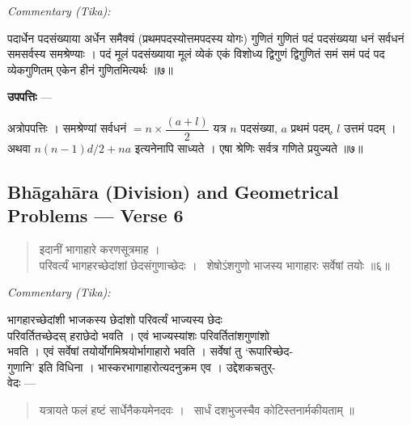 \documentclass[11pt,a4paper]{article}
\newcommand{\skt}[1]{{\devanagarifont\color{sktcolor} #1}}
\newenvironment{shloka}{%
  \begin{quote}%
  \smallskip%
  \devanagarifont\color{sktcolor}%
}{%
  \smallskip%
  \end{quote}%
}
\newenvironment{tika}{%
  \smallskip%
  \noindent\textit{Commentary (Tika):}\par%
  \smallskip%
  \hindifont\small%
}{%
  \par\smallskip%
}
\newenvironment{upapatti}{%
  \smallskip%
  \noindent\textbf{\devanagarifont उपपत्तिः} — \devanagarifont\small%
}{%
  \par\smallskip%
}
\begin{document}
\vspace{0.3cm}
\begin{tika}
\skt{पदार्धेन} पदसंख्याया अर्धेन \skt{समैक्यं} (प्रथमपदस्योत्तमपदस्य योगः) \skt{गुणितं} गुणितं \skt{पदं} पदसंख्यया \skt{धनं} सर्वधनं \skt{समसर्वस्य} समश्रेण्याः । \skt{पदं मूलं} पदसंख्याया मूलं \skt{व्येकं} एकं विशोध्य \skt{द्विगुणं} द्विगुणितं \skt{समं} समं \skt{पदं} पद \skt{व्येकगुणितम्} एकेन हीनं गुणितमित्यर्थः ॥७॥
\end{tika}

\vspace{0.3cm}
\begin{upapatti}
\skt{अत्रोपपत्तिः} । समश्रेण्यां सर्वधनं $= n \times \dfrac{(a + l)}{2}$ यत्र $n$ पदसंख्या, $a$ प्रथमं पदम्, $l$ उत्तमं पदम् । अथवा $n(n-1)d/2 + na$ इत्यनेनापि साध्यते । एषा श्रेणिः सर्वत्र गणिते प्रयुज्यते ॥७॥
\end{upapatti}

\newpage
\subsection*{Bhāgahāra (Division) and Geometrical Problems — Verse 6}

\begin{shloka}
\skt{इदानीं भागाहारे करणसूत्रमाह ।}\\[0.5em]
\skt{परिवर्त्यं भागहरच्छेदांशां छेदसंगुणाच्छेदः ।}\
\skt{शेषोऽंशगुणो भाजस्य भागाहारः सर्वेषां तयोः} ॥६॥
\end{shloka}

\vspace{0.3cm}
\begin{tika}
\skt{भागहारच्छेदांशी भाजकस्य छेदांशो परिवर्त्यं भाज्यस्य छेदः}\\
\skt{परिवर्तितच्छेदस् हराछेदो भवति । एवं भाज्यस्यांशः परिवर्तितांशगुणांशो}\\
\skt{भवति । एवं सर्वेषां तयोर्योगमिश्रयोर्भागाहारो भवति । सर्वेषां तु `रूपारिच्छेद-}\\
\skt{गुणानि' इति विधिना । भास्करभागाहारोत्यदनुक्रम एव । उद्देशकचतुर्-}\\
\skt{वेदः —}
\end{tika}

\vspace{0.5cm}

\begin{shloka}
\skt{यत्रायते फलं हष्टं सार्धेनैकयमेनदवः ।}\
\skt{सार्धं दशभुजस्चैव कोटिस्तनार्मकीयताम्} ॥
\end{shloka}
\end{document}
